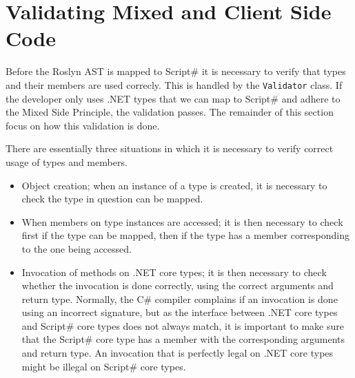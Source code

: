 \section{Validating Mixed and Client Side Code} %
\label{sec:syntax_tree_validation}

	Before the Roslyn AST is mapped to Script\# it is necessary to verify that types and their members are used correcly. This is handled by the \texttt{Validator} class. If the developer only uses .NET types that we can map to Script\# and adhere to the Mixed Side Principle, the validation passes. The remainder of this section focus on how this validation is done.




There are essentially three situations in which it is necessary to verify correct usage of types and members.

\begin{itemize}
	\item Object creation; when an instance of a type is created, it is necessary to check the type in question can be mapped.
	\item When members on type instances are accessed; it is then necessary to check first if the type can be mapped, then if the type has a member corresponding to the one being accessed.
	\item Invocation of methods on .NET core types; it is then necessary to check whether the invocation is done correctly, using the correct arguments and return type. Normally, the C\# compiler complains if an invocation is done using an incorrect signature, but as the interface between .NET core types and Script\# core types does not always match, it is important to make sure that the Script\# core type has a member with the corresponding arguments and return type. An invocation that is perfectly legal on .NET core types might be illegal on Script\# core types.
\end{itemize}

